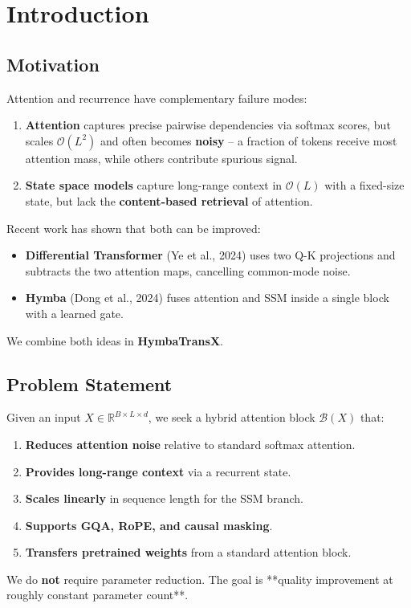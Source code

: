 \section{Introduction}

\subsection{Motivation}

Attention and recurrence have complementary failure modes:

\begin{enumerate}
\item \textbf{Attention} captures precise pairwise dependencies via softmax scores,
  but scales $\mathcal{O}(L^2)$ and often becomes \textbf{noisy} -- a fraction
  of tokens receive most attention mass, while others contribute spurious
  signal.
\item \textbf{State space models} capture long-range context in $\mathcal{O}(L)$
  with a fixed-size state, but lack the \textbf{content-based retrieval} of
  attention.

\end{enumerate}
Recent work has shown that both can be improved:

\begin{itemize}
\item \textbf{Differential Transformer} (Ye et al., 2024) uses two Q-K projections and
  subtracts the two attention maps, cancelling common-mode noise.
\item \textbf{Hymba} (Dong et al., 2024) fuses attention and SSM inside a single block
  with a learned gate.

\end{itemize}
We combine both ideas in \textbf{HymbaTransX}.

\subsection{Problem Statement}

Given an input $X \in \mathbb{R}^{B \times L \times d}$, we seek a hybrid 
attention block $\mathcal{B}(X)$ that:

\begin{enumerate}
\item \textbf{Reduces attention noise} relative to standard softmax attention.
\item \textbf{Provides long-range context} via a recurrent state.
\item \textbf{Scales linearly} in sequence length for the SSM branch.
\item \textbf{Supports GQA, RoPE, and causal masking}.
\item \textbf{Transfers pretrained weights} from a standard attention block.

\end{enumerate}
We do \textbf{not} require parameter reduction. The goal is **quality improvement 
at roughly constant parameter count**.

